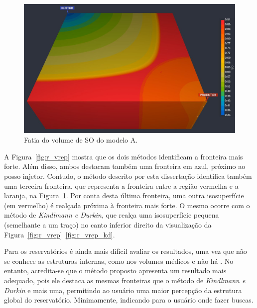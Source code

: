 \begin{figure}[h]
	\centering
	\includegraphics[width=1\textwidth]{images/r_vrep_so_slice}
	\caption{Fatia do volume de SO do modelo A.}
	\label{fig:box_slice}
\end{figure}

	A Figura~\ref{fig:r_vrep} mostra que os dois métodos identificam a fronteira mais forte. Além disso, ambos destacam também uma fronteira em azul, próximo ao posso injetor. Contudo, o método descrito por esta dissertação identifica também uma terceira fronteira, que representa a fronteira entre a região vermelha e a laranja, na Figura~\ref{fig:box_slice}. Por conta desta última fronteira, uma outra isosuperfície (em vermelho) é realçada próxima à fronteira mais forte. O mesmo ocorre com o método de \textit{Kindlmann e Durkin}, que realça uma isosuperfície pequena (semelhante a um traço) no canto inferior direito da visualização da Figura~\ref{fig:r_vrep}~\ref{fig:r_vrep_kd}.
	
	Para os reservatórios é ainda mais difícil avaliar os resultados, uma vez que não se conhece as estruturas internas, como nos volumes médicos e não há . No entanto, acredita-se que o método proposto apresenta um resultado mais adequado, pois ele destaca as mesmas fronteiras que o método de \textit{Kindlmann e Durkin} e mais uma, permitindo ao usuário uma maior percepção da estrutura global do reservatório. Minimamente, indicando para o usuário onde fazer buscas.

